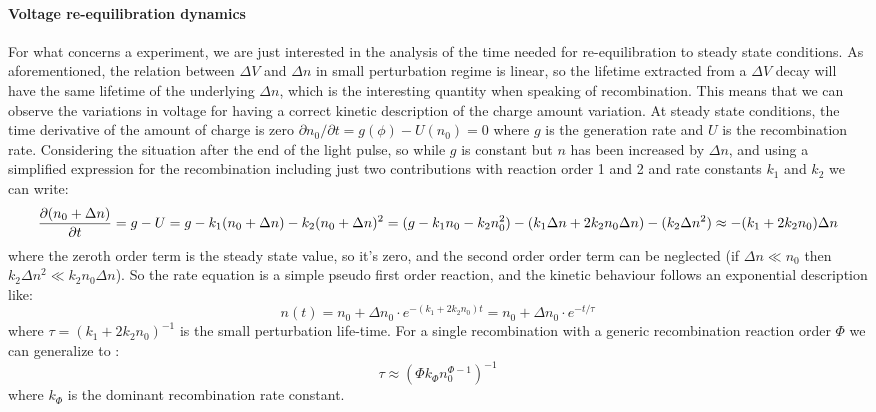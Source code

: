 	\paragraph{Voltage re\hyp{}equilibration dynamics}
	For what concerns a  experiment, we are just interested in the analysis of the time needed for re\hyp{}equilibration to steady state conditions.
	As aforementioned, the relation between $\Delta V$ and $\Delta n$ in small perturbation regime is linear, so the lifetime extracted from a $\Delta V$ decay will have the same lifetime of the underlying $\Delta n$, which is the interesting quantity when speaking of recombination.
	This means that we can observe the variations in voltage for having a correct kinetic description of the charge amount variation.
	At steady state conditions, the time derivative of the amount of charge is zero $\partial n_0 / \partial t = g(\phi) - U(n_0) = 0$ where $g$ is the generation rate and $U$ is the recombination rate.
	Considering the situation after the end of the light pulse, so while $g$ is constant but $n$ has been increased by $\Delta n$, and using a simplified expression for the recombination including just two contributions with reaction order 1 and 2 and rate constants $k_1$ and $k_2$ we can write:
	\begin{dmath}
		\pdv{(n_0 + \Delta n)}{t} = g - U = g - k_1(n_0 + \Delta n) - k_2(n_0 + \Delta n)^2 = (g - k_1 n_0 - k_2 n_0^2) - (k_1 \Delta n + 2 k_2 n_0 \Delta n) - (k_2 \Delta n ^2) \approx - (k_1 + 2 k_2 n_0 ) \Delta n
	\end{dmath}
	where the zeroth order term is the steady state value, so it's zero, and the second order order term can be neglected (if $\Delta n \ll n_0$ then $k_2 \Delta n^2 \ll k_2 n_0 \Delta n$).
	So the rate equation is a simple pseudo first order reaction, and the kinetic behaviour follows an exponential description like:
	\begin{equation}\label{eq:tpv_monoexp}
		n (t) = n_0 + \Delta n_0 \cdot e^{-(k_1 + 2 k_2 n_0) t} = n_0 + \Delta n_0 \cdot e^{-t / \tau}
	\end{equation}
	where $\tau = (k_1 + 2 k_2 n_0)^{-1}$ is the small perturbation life\hyp{}time.
	For a single recombination with a generic recombination reaction order $\Phi$ we can generalize to \cite{Shuttle2008}:
	\begin{equation}\label{eq:tpv_tau_order}
		\tau \approx (\Phi k_\Phi n_0^{\Phi-1})^{-1}
	\end{equation}
	where $k_\Phi$ is the dominant recombination rate constant.
	
